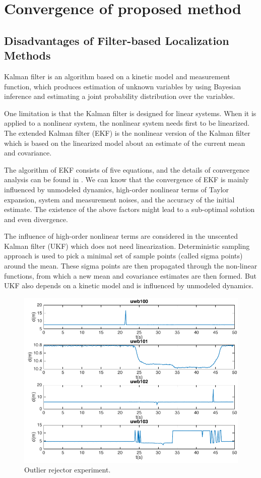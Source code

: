 \documentclass[journal]{IEEEtran}
\begin{document}
\section{Convergence of proposed method}\label{a5}

\subsection{Disadvantages of Filter-based Localization Methods}

Kalman filter is an algorithm based on a kinetic model and measurement function, which produces estimation of unknown variables by using Bayesian inference and estimating a joint probability distribution over the variables.

One limitation is that the Kalman filter is designed for linear systems. When it is applied to a nonlinear system, the nonlinear system needs first to be linearized. The extended Kalman filter (EKF) is the nonlinear version of the Kalman filter which is based on the linearized model about an estimate of the current mean and covariance.

The algorithm of EKF consists of five equations, and the details of convergence analysis can be found in \cite{Boutayeb:1997bj}. We can know that the convergence of EKF is mainly influenced by unmodeled dynamics, high-order nonlinear terms of Taylor expansion, system and measurement noises, and the accuracy of the initial estimate. The existence of the above factors might lead to a sub-optimal solution and even divergence.   

The influence of high-order nonlinear terms are considered in the unscented Kalman filter (UKF) which does not need linearization. Deterministic sampling approach is used to pick a minimal set of sample points (called sigma points) around the mean. These sigma points are then propagated through the non-linear functions, from which a new mean and covariance estimates are then formed. But UKF also depends on a  kinetic model and is influenced by unmodeled dynamics.

\begin{figure}[!t]
\centering
\includegraphics[width=1\linewidth]{pic/rejector.pdf}
\caption{Outlier rejector experiment.}
\label{figa5}
\end{figure}
\end{document}
